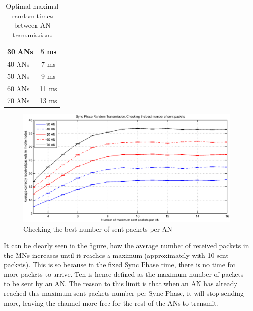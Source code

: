 \begin{table}
 \begin{center}
  \begin{tabular}{|l|c|}
   \hline
   30 \acp{AN} & 5 ms \\
   \hline
   40 \acp{AN} & 7 ms \\
   \hline
   50 \acp{AN} & 9 ms \\
   \hline
   60 \acp{AN} & 11 ms \\
   \hline
   70 \acp{AN} & 13 ms \\
   \hline
  \end{tabular}
  \caption{Optimal maximal random times between \ac{AN} transmissions}
  \label{tab:optimalTransmitTimes}
 \end{center}
\end{table}

\begin{figure}[ht]
 \begin{center}
  \includegraphics[width=1\textwidth]{randomTimeCheckingTheBestNumberOfSentPacketsForAnchor.eps}
 \end{center}
 \caption{Checking the best number of sent packets per \ac{AN}}
 \label{fig:randomTimeCheckingTheBestNumberOfSentPacketsForAnchor}
\end{figure}

It can be clearly seen in the figure, how the average number of received packets in the \acp{MN} increases until it reaches a maximum (approximately
with 10 sent packets). This is so because in the fixed Sync Phase time, there is no time for more packets to arrive. Ten is hence defined as the 
maximum number of packets to be sent by an \ac{AN}. The reason to this limit is that when an \ac{AN} has already reached this maximum sent packets number per Sync Phase, 
it will stop sending more, leaving the channel more free for the rest of the \acp{AN} to transmit.

